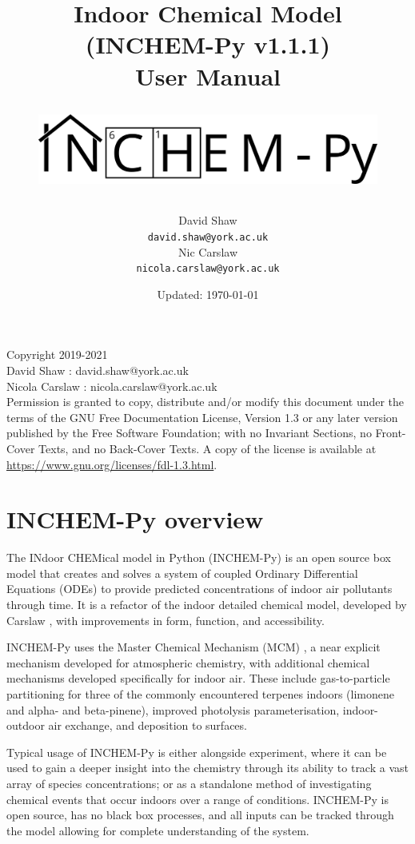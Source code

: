 \documentclass[a4paper]{refart}
\title{Indoor Chemical Model (INCHEM-Py v1.1.1) \\
User Manual\\
\begin{figure}
    \hspace{-0.25\textwidth}\hspace{0.25in}
    \includegraphics[width=\textwidth]{INCHEMPY_logo.png}
\end{figure}}
\author{
David Shaw\\
\texttt{david.shaw@york.ac.uk}\\
Nic Carslaw\\
\texttt{nicola.carslaw@york.ac.uk}\\
}
\date{Updated: \today}
\begin{document}
\maketitle


\newpage
\tableofcontents


\vspace*{\fill}

Copyright \textcopyright \hspace{1mm}2019-2021 \\
David Shaw : david.shaw@york.ac.uk\\
Nicola Carslaw : nicola.carslaw@york.ac.uk\\


Permission is granted to copy, distribute and/or modify this
document under the terms of the GNU Free Documentation License,
Version 1.3 or any later version published by the Free Software
Foundation; with no Invariant Sections, no Front-Cover Texts, and
no Back-Cover Texts.  A copy of the license is available at \url{https://www.gnu.org/licenses/fdl-1.3.html}.


\newpage
\section{INCHEM-Py overview}
The INdoor CHEMical model in Python (INCHEM-Py) is an open source box model that creates and solves a system of coupled Ordinary Differential Equations (ODEs) to provide predicted concentrations of indoor air pollutants through time. It is a refactor of the indoor detailed chemical model, developed by Carslaw  \cite{Carslaw2007}, with improvements in form, function, and accessibility.

INCHEM-Py uses the Master Chemical Mechanism (MCM) \cite{Jenkin1997,Saunders2003,Bloss2005,Jenkin2012,Jenkin2015}, a near explicit mechanism developed for atmospheric chemistry, with additional chemical mechanisms developed specifically for indoor air. These include gas-to-particle partitioning for three of the commonly encountered terpenes indoors (limonene and alpha- and beta-pinene), improved photolysis parameterisation, indoor-outdoor air exchange, and deposition to surfaces. 

Typical usage of INCHEM-Py is either alongside experiment, where it can be used to gain a deeper insight into the chemistry through its ability to track a vast array of species concentrations; or as a standalone method of investigating chemical events that occur indoors over a range of conditions. INCHEM-Py is open source, has no black box processes, and all inputs can be tracked through the model allowing for complete understanding of the system.  
\end{document}

